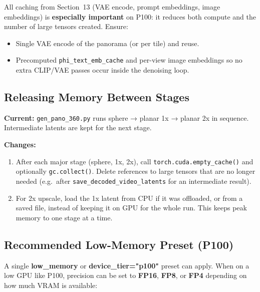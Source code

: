 \documentclass[11pt,a4paper]{article}
\newcommand{\file}[1]{\texttt{#1}}
\newcommand{\fn}[1]{\texttt{#1}}
\begin{document}
All caching from Section~13 (VAE encode, prompt embeddings, image embeddings) is \textbf{especially important} on P100: it reduces both compute and the number of large tensors created. Ensure:
\begin{itemize}
    \item Single VAE encode of the panorama (or per tile) and reuse.
    \item Precomputed \fn{phi\_text\_emb\_cache} and per-view image embeddings so no extra CLIP/VAE passes occur inside the denoising loop.
\end{itemize}

\subsection{Releasing Memory Between Stages}

\textbf{Current:} \file{gen\_pano\_360.py} runs sphere → planar 1x → planar 2x in sequence. Intermediate latents are kept for the next stage.

\textbf{Changes:}
\begin{enumerate}
    \item After each major stage (sphere, 1x, 2x), call \fn{torch.cuda.empty\_cache()} and optionally \fn{gc.collect()}. Delete references to large tensors that are no longer needed (e.g.\ after \fn{save\_decoded\_video\_latents} for an intermediate result).
    \item For 2x upscale, load the 1x latent from CPU if it was offloaded, or from a saved file, instead of keeping it on GPU for the whole run. This keeps peak memory to one stage at a time.
\end{enumerate}

\subsection{Recommended Low-Memory Preset (P100)}

A single \textbf{low\_memory} or \textbf{device\_tier="p100"} preset can apply. When on a low GPU like P100, precision can be set to \textbf{FP16}, \textbf{FP8}, or \textbf{FP4} depending on how much VRAM is available:
\end{document}
